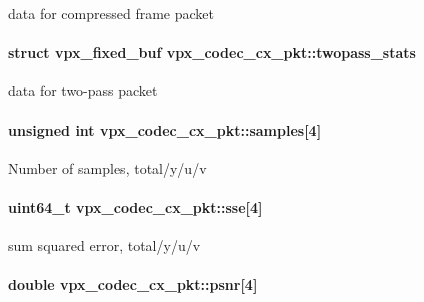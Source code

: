 \label{structvpx__codec__cx__pkt_a81e33bf4408a3983abb16492fee359ff}
data for compressed frame packet \hypertarget{structvpx__codec__cx__pkt_a53db8576979fa7335e478eb849b256f1}{
\paragraph[{twopass\-\_\-stats}]{\setlength{\rightskip}{0pt plus 5cm}struct {\bf vpx\-\_\-fixed\-\_\-buf} {\bf vpx\-\_\-codec\-\_\-cx\-\_\-pkt\-::twopass\-\_\-stats}}}
\label{structvpx__codec__cx__pkt_a53db8576979fa7335e478eb849b256f1}
data for two-\/pass packet \hypertarget{structvpx__codec__cx__pkt_a4d3fc7eb2d19c5913c6f3f474e5cf77b}{
\paragraph[{samples}]{\setlength{\rightskip}{0pt plus 5cm}unsigned int {\bf vpx\-\_\-codec\-\_\-cx\-\_\-pkt\-::samples}\mbox{[}4\mbox{]}}}
\label{structvpx__codec__cx__pkt_a4d3fc7eb2d19c5913c6f3f474e5cf77b}
\-Number of samples, total/y/u/v \hypertarget{structvpx__codec__cx__pkt_ad65e918d3f26743cc7a8898b88bcb397}{
\paragraph[{sse}]{\setlength{\rightskip}{0pt plus 5cm}uint64\-\_\-t {\bf vpx\-\_\-codec\-\_\-cx\-\_\-pkt\-::sse}\mbox{[}4\mbox{]}}}
\label{structvpx__codec__cx__pkt_ad65e918d3f26743cc7a8898b88bcb397}
sum squared error, total/y/u/v \hypertarget{structvpx__codec__cx__pkt_a63744aeceb50355d6402d55309c151b6}{
\paragraph[{psnr}]{\setlength{\rightskip}{0pt plus 5cm}double {\bf vpx\-\_\-codec\-\_\-cx\-\_\-pkt\-::psnr}\mbox{[}4\mbox{]}}}
\label{structvpx__codec__cx__pkt_a63744aeceb50355d6402d55309c151b6}
